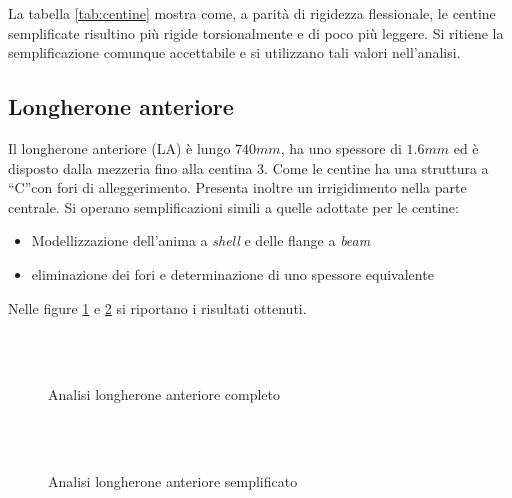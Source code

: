 \documentclass[
10pt, %
a4paper, %
oneside, %
headinclude,footinclude, %
BCOR5mm, %
]{scrartcl}
\begin{document}
La tabella \ref{tab:centine} mostra come, a parità di rigidezza flessionale, le centine semplificate risultino più rigide torsionalmente e di poco più leggere. Si ritiene la semplificazione comunque accettabile e si utilizzano tali valori nell'analisi.

\newpage

\subsection{Longherone anteriore}

Il longherone anteriore (LA) è lungo $740mm$, ha uno spessore di $1.6mm$ ed è disposto dalla mezzeria fino alla centina 3. Come le centine ha una struttura a \textquotedblleft C\textquotedblright con fori di alleggerimento. Presenta inoltre un irrigidimento nella parte centrale.
Si operano semplificazioni simili a quelle adottate per le centine:

\begin{itemize}
	\item Modellizzazione dell'anima a \emph{shell} e delle flange a \emph{beam}
	\item eliminazione dei fori e determinazione di uno spessore equivalente
\end{itemize}

Nelle figure \ref{fig:FS_compl} e \ref{fig:FS_simp} si riportano i risultati ottenuti.


\begin{figure}[tb]
	\centering
	 \\
	 \\
	\caption[Longherone anteriore completo]{Analisi longherone anteriore completo} %
	\label{fig:FS_compl}
\end{figure}


\begin{figure}[tb]
	\centering
	 \\
	 \\
	\caption[Longherone anteriore semplificato]{Analisi longherone anteriore semplificato} %
	\label{fig:FS_simp}
\end{figure}
\end{document}

